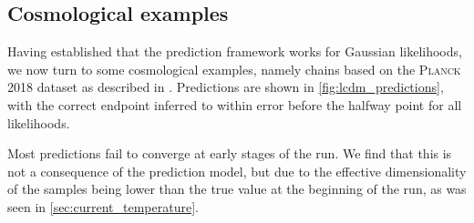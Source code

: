 \documentclass[usenatbib]{mnras}
\begin{document}
\subsection{Cosmological examples}\label{subsec:cosmological_examples}
Having established that the prediction framework works for Gaussian likelihoods, we now turn to some cosmological examples, namely chains based on the \textsc{Planck 2018} dataset as described in \citet{curvature_tension}. Predictions are shown in \cref{fig:lcdm_predictions}, with the correct endpoint inferred to within error before the halfway point for all likelihoods.
\par
Most predictions fail to converge at early stages of the run. We find that this is not a consequence of the prediction model, but due to the effective dimensionality of the samples being lower than the true value at the beginning of the run, as was seen in \cref{sec:current_temperature}.
\end{document}

